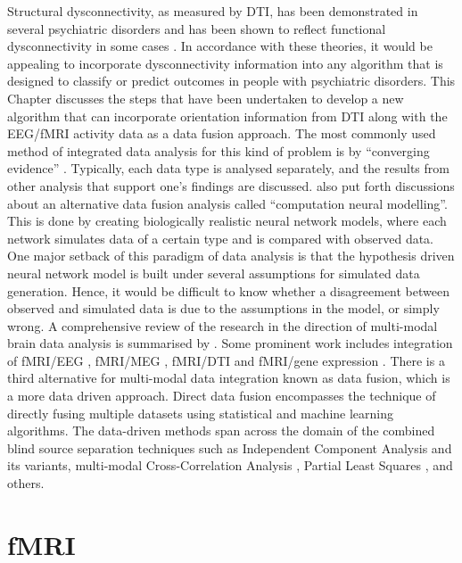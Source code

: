 Structural dysconnectivity, as measured by DTI, has been demonstrated in several psychiatric disorders and has been shown to reflect functional dysconnectivity in some cases \citep{greicius2009resting, stephan2009dysconnection}. In accordance with these theories, it would be appealing to incorporate dysconnectivity information into any algorithm that is designed to classify or predict outcomes in people with psychiatric disorders. This Chapter discusses the steps that have been undertaken to develop a new algorithm that can incorporate orientation information from DTI along with the EEG/fMRI activity data as a data fusion approach. The most commonly used method of integrated data analysis for this kind of problem is by “converging evidence” \citep{horwitz2002can}. Typically, each data type is analysed separately, and the results from other analysis that support one's findings are discussed. \citet{horwitz2002can} also put forth discussions about an alternative data fusion analysis called “computation neural modelling”. This is done by creating biologically realistic neural network models, where each network simulates data of a certain type and is compared with observed data. One major setback of this paradigm of data analysis is that the hypothesis driven neural network model is built under several assumptions for simulated data generation. Hence, it would be difficult to know whether a disagreement between observed and simulated data is due to the assumptions in the model, or simply wrong. A comprehensive review of the research in the direction of multi-modal brain data analysis is summarised by \citet{sui2012review}. Some prominent work includes integration of fMRI/EEG \citep{valdes2009model}, fMRI/MEG \citep{plis2011effective}, fMRI/DTI \citep{stampfli2008combining, kleiser2010impact} and fMRI/gene expression \citep{yang2010hybrid}. There is a third alternative for multi-modal data integration known as data fusion, which is a more data driven approach. Direct data fusion encompasses the technique of directly fusing multiple datasets using statistical and machine learning algorithms. The data-driven methods span across the domain of the combined blind source separation techniques such as Independent Component Analysis \citep{calhoun2009review, teipel2010white} and its variants, multi-modal Cross-Correlation Analysis \citep{correa2008canonical,correa2010multi,correa2008examining}, Partial Least Squares \citep{chen2009linking}, and others. 

\section{fMRI}


